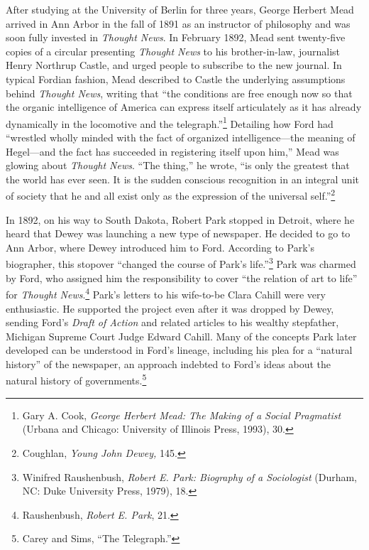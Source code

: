 \documentclass[twoside,symmetric,nobib,justified]{tufte-book}
\begin{document}
After studying at the University of Berlin for three years, George
Herbert Mead arrived in Ann Arbor in the fall of 1891 as an instructor
of philosophy and was soon fully invested in \emph{Thought News}. In
February 1892, Mead sent twenty-five copies of a circular presenting
\emph{Thought News} to his brother-in-law, journalist Henry Northrup
Castle, and urged people to subscribe to the new journal. In typical
Fordian fashion, Mead described to Castle the underlying assumptions
behind \emph{Thought News}, writing that ``the conditions are free
enough now so that the organic intelligence of America can express
itself articulately as it has already dynamically in the locomotive and
the telegraph.''\footnote{Gary A. Cook, \emph{George Herbert Mead: The
  Making of a Social Pragmatist} (Urbana and Chicago: University of
  Illinois Press, 1993), 30.} Detailing how Ford had ``wrestled wholly
minded with the fact of organized intelligence---the meaning of
Hegel---and the fact has succeeded in registering itself upon him,''
Mead was glowing about \emph{Thought News}. ``The thing,'' he wrote,
``is only the greatest that the world has ever seen. It is the sudden
conscious recognition in an integral unit of society that he and all
exist only as the expression of the universal self.''\footnote{Coughlan,
  \emph{Young John Dewey,} 145.}

In 1892, on his way to South Dakota, Robert Park stopped in Detroit,
where he heard that Dewey was launching a new type of newspaper. He
decided to go to Ann Arbor, where Dewey introduced him to Ford.
According to Park's biographer, this stopover ``changed the course of
Park's life.''\footnote{Winifred Raushenbush, \emph{Robert E. Park:
  Biography of a Sociologist} (Durham, NC: Duke University Press, 1979),
  18.} Park was charmed by Ford, who assigned him the responsibility to
cover ``the relation of art to life'' for \emph{Thought
News}.\footnote{Raushenbush, \emph{Robert E. Park}, 21.} Park's letters
to his wife-to-be Clara Cahill were very enthusiastic. He supported the
project even after it was dropped by Dewey, sending Ford's \emph{Draft
of Action} and related articles to his wealthy stepfather, Michigan
Supreme Court Judge Edward Cahill. Many of the concepts Park later
developed can be understood in Ford's lineage, including his plea for a
``natural history'' of the newspaper, an approach indebted to Ford's
ideas about the natural history of governments.\footnote{Carey and Sims,
  ``The Telegraph.''}
\end{document}
